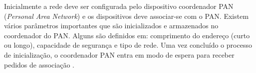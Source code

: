 \documentclass[12pt]{uftpibicsic2018}
\begin{document}
Inicialmente a rede deve ser configurada pelo dispositivo coordenador PAN ({\it Personal Area Network}) e os dispositivos deve associar-se com o PAN. Existem vários parâmetros importantes que são inicializados e armazenados no coordenador do PAN. Alguns são definidos em: comprimento do endereço (curto ou longo), capacidade de segurança e tipo de rede. Uma vez concluído o processo de inicialização, o coordenador PAN entra em modo de espera para receber pedidos de associação \cite{marcos}.


%
%
\end{document}
